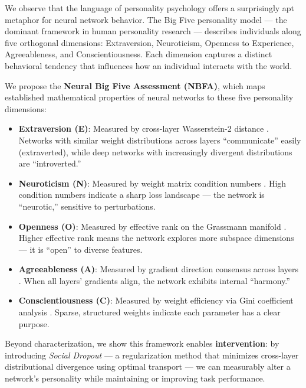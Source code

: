 \documentclass[letterpaper]{article}
\begin{document}
We observe that the language of personality psychology offers a surprisingly apt metaphor for neural network behavior. The Big Five personality model \citep{goldberg1990alternative} — the dominant framework in human personality research — describes individuals along five orthogonal dimensions: Extraversion, Neuroticism, Openness to Experience, Agreeableness, and Conscientiousness. Each dimension captures a distinct behavioral tendency that influences how an individual interacts with the world.

We propose the \textbf{Neural Big Five Assessment (NBFA)}, which maps established mathematical properties of neural networks to these five personality dimensions:

\begin{itemize}
    \item \textbf{Extraversion (E)}: Measured by cross-layer Wasserstein-2 distance \citep{bonneel2015sliced}. Networks with similar weight distributions across layers ``communicate'' easily (extraverted), while deep networks with increasingly divergent distributions are ``introverted.''
    
    \item \textbf{Neuroticism (N)}: Measured by weight matrix condition numbers \citep{li2018visualizing}. High condition numbers indicate a sharp loss landscape — the network is ``neurotic,'' sensitive to perturbations.
    
    \item \textbf{Openness (O)}: Measured by effective rank on the Grassmann manifold \citep{roy2007effective}. Higher effective rank means the network explores more subspace dimensions — it is ``open'' to diverse features.
    
    \item \textbf{Agreeableness (A)}: Measured by gradient direction consensus across layers \citep{yu2020gradient}. When all layers' gradients align, the network exhibits internal ``harmony.''
    
    \item \textbf{Conscientiousness (C)}: Measured by weight efficiency via Gini coefficient analysis \citep{frankle2019lottery}. Sparse, structured weights indicate each parameter has a clear purpose.
\end{itemize}

Beyond characterization, we show this framework enables \textbf{intervention}: by introducing \emph{Social Dropout} — a regularization method that minimizes cross-layer distributional divergence using optimal transport — we can measurably alter a network's personality while maintaining or improving task performance.
\end{document}
